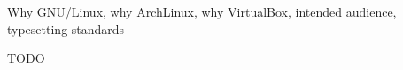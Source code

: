 
\begin{chapsummary}
Why GNU/Linux, why ArchLinux, why VirtualBox, intended audience, typesetting
standards
\end{chapsummary}

TODO
